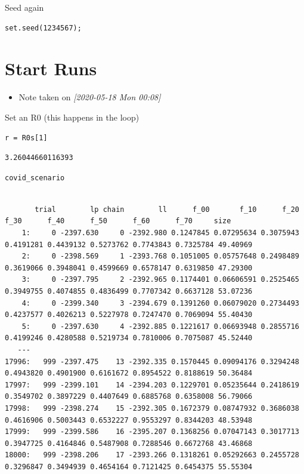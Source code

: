 \documentclass[11pt]{article}
\begin{document}
Seed again
\begin{verbatim}
set.seed(1234567);
\end{verbatim}
\section{Start Runs}
\label{sec:org669d344}
\begin{itemize}
\item Note taken on \textit{[2020-05-18 Mon 00:08]}
\end{itemize}
Set an R0 (this happens in the loop)
\begin{verbatim}
r = R0s[1]
\end{verbatim}

\begin{verbatim}
3.26044660116393
\end{verbatim}

\begin{verbatim}
covid_scenario
\end{verbatim}

\begin{verbatim}

       trial        lp chain        ll      f_00       f_10      f_20      f_30      f_40      f_50      f_60      f_70     size
    1:     0 -2397.630     0 -2392.980 0.1247845 0.07295634 0.3075943 0.4191281 0.4439132 0.5273762 0.7743843 0.7325784 49.40969
    2:     0 -2398.569     1 -2393.768 0.1051005 0.05757648 0.2498489 0.3619066 0.3948041 0.4599669 0.6578147 0.6319850 47.29300
    3:     0 -2397.795     2 -2392.965 0.1174401 0.06606591 0.2525465 0.3949755 0.4074855 0.4836499 0.7707342 0.6637128 53.07236
    4:     0 -2399.340     3 -2394.679 0.1391260 0.06079020 0.2734493 0.4237577 0.4026213 0.5227978 0.7247470 0.7069094 55.40430
    5:     0 -2397.630     4 -2392.885 0.1221617 0.06693948 0.2855716 0.4199246 0.4280588 0.5219734 0.7810006 0.7075087 45.52440
   ---                                                                                                                          
17996:   999 -2397.475    13 -2392.335 0.1570445 0.09094176 0.3294248 0.4943820 0.4901900 0.6161672 0.8954522 0.8188619 50.36484
17997:   999 -2399.101    14 -2394.203 0.1229701 0.05235644 0.2418619 0.3549702 0.3897229 0.4407649 0.6885768 0.6358008 56.79066
17998:   999 -2398.274    15 -2392.305 0.1672379 0.08747932 0.3686038 0.4616906 0.5003443 0.6532227 0.9553297 0.8344203 48.53948
17999:   999 -2399.586    16 -2395.207 0.1368256 0.07047143 0.3017713 0.3947725 0.4164846 0.5487908 0.7288546 0.6672768 43.46868
18000:   999 -2398.206    17 -2393.266 0.1318261 0.05292663 0.2455728 0.3296847 0.3494939 0.4654164 0.7121425 0.6454375 55.55304
\end{verbatim}
\end{document}
